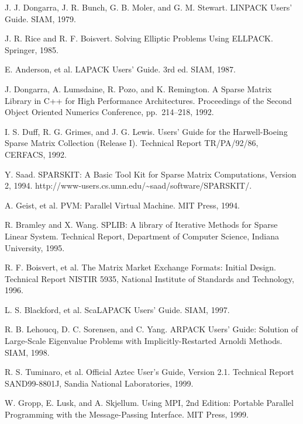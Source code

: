 \documentclass[a4paper]{jarticle}
\begin{document}
{\begin{thebibliography}{10}
J. J. Dongarra, J. R. Bunch, G. B. Moler, and G. M. Stewart.
\newblock LINPACK Users' Guide.
\newblock SIAM, 1979.

J. R. Rice and R. F. Boisvert.
\newblock Solving Elliptic Problems Using ELLPACK.
\newblock Springer, 1985.

E. Anderson, et al. 
\newblock LAPACK Users' Guide. 3rd ed.
\newblock SIAM, 1987.

J. Dongarra, A. Lumsdaine, R. Pozo, and K. Remington.
\newblock A Sparse Matrix Library in C++ for High Performance Architectures.
\newblock Proceedings of the Second Object Oriented Numerics Conference,
	pp.\ 214--218, 1992.

I. S. Duff, R. G. Grimes, and J. G. Lewis.
\newblock Users' Guide for the Harwell-Boeing Sparse Matrix Collection
(Release I).
\newblock Technical Report TR/PA/92/86, CERFACS, 1992.

Y. Saad.
\newblock SPARSKIT: A Basic Tool Kit for Sparse Matrix Computations,
  Version 2, 1994.
\newblock http://www-users.cs.umn.edu/\textasciitilde saad/software/SPARSKIT/.

A. Geist, et al.
\newblock PVM: Parallel Virtual Machine.
\newblock MIT Press, 1994.

R. Bramley and X. Wang.
\newblock SPLIB: A library of Iterative Methods for Sparse Linear System.
\newblock Technical Report, Department of Computer Science, Indiana University, 1995.

R. F. Boisvert, et al. 
\newblock The Matrix Market Exchange Formats: Initial Design. 
\newblock Technical Report NISTIR 5935, National Institute of Standards and
	Technology, 1996.

L. S. Blackford, et al.
\newblock ScaLAPACK Users' Guide.
\newblock SIAM, 1997.

R. B. Lehoucq, D. C. Sorensen, and C. Yang.
\newblock ARPACK Users' Guide: Solution of Large-Scale Eigenvalue Problems with Implicitly-Restarted Arnoldi Methods. 
\newblock SIAM, 1998. 

R. S. Tuminaro, et al.
\newblock Official Aztec User's Guide, Version 2.1.
\newblock Technical Report SAND99-8801J, Sandia National Laboratories, 1999.

W. Gropp, E. Lusk, and A. Skjellum.
\newblock Using MPI, 2nd Edition: Portable Parallel Programming with the
	Message-Passing Interface.
\newblock MIT Press, 1999.


\end{thebibliography}}
\end{document}

